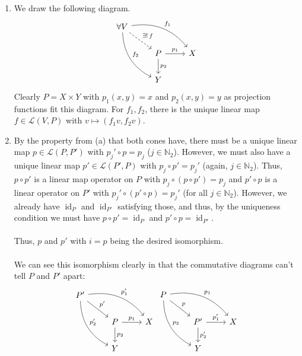 \documentclass[letterpaper, 12pt]{hmcpset}
\begin{document}
\begin{solution}
	\begin{enumerate}
		\item
			We draw the following diagram.
			\[
				\begin{tikzcd}
					\forall V \ar[rrd, bend left, "f_1"] \ar[ddr, bend right, "f_2"] \ar[rd, dashrightarrow , "\exists ! \, f"] \\
					 & P \ar[r, "p_1"] \ar[d, "p_2"] & X \\
					 & Y 
				\end{tikzcd}
			\]
			Clearly $P = X \times Y$ with $p_1(x, y) = x$ and $p_2(x, y) = y$ as projection functions fit this diagram. For $f_1, f_2$, there is the unique linear map $f \in \mathcal L(V, P)$ with $v \mapsto (f_1 v, f_2 v)$.
		\item
			By the property from (a) that both cones have, there must be a unique linear map $p \in \mathcal L(P, P')$ with $p_j' \circ p = p_j$ ($j \in \mathbb N_2$). However, we must also have a unique linear map $p' \in \mathcal L(P', P)$ with $p_j \circ p' = p_j'$ (again, $j \in \mathbb N_2$). Thus, $p \circ p'$ is a linear map operator on $P$ with $p_j \circ (p \circ p') = p_j$ and $p' \circ p$ is a linear operator on $P'$ with $p_j' \circ (p' \circ p) = p_j'$ (for all $j \in \mathbb N_2$). However, we already have $\operatorname{id}_P$ and $\operatorname{id}_{P'}$ satisfying those, and thus, by the uniqueness condition we must have $p \circ p' = \operatorname{id}_P$ and $p' \circ p = \operatorname{id}_{P'}$. \\\\
			Thus, $p$ and $p'$ with $i = p$ being the desired isomorphism.\\\\
			We can see this isomorphism clearly in that the commutative diagrams can't tell $P$ and $P'$ apart:
			\[
				\begin{tikzcd}
					 P' \ar[rrd, bend left, "p_1'"] \ar[ddr, bend right, "p_2'"] \ar[rd, "p'"] \\
					 & P \ar[r, "p_1"] \ar[d, "p_2"] & X \\
					 & Y 
				\end{tikzcd}
				\begin{tikzcd}
					 P \ar[rrd, bend left, "p_1"] \ar[ddr, bend right, "p_2"] \ar[rd, "p"] \\
					 & P' \ar[r, "p_1'"] \ar[d, "p_2'"] & X \\
					 & Y 
				\end{tikzcd}
			\]


\end{enumerate}
\end{solution}
\end{document}
